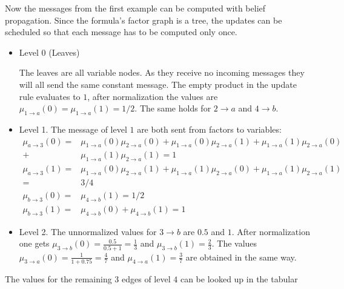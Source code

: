 \begin{example}
Now the messages from the first example can be computed with belief propagation.
Since the formula's factor graph is a tree, the updates can be scheduled so that each message has to be computed only once.

\begin{itemize}
\item Level 0 (Leaves)

The leaves are all variable nodes. As they receive no incoming messages they will all send the same constant message. The empty product in the update rule evaluates to $1$, after normalization the values are \newline $\mu_{1 \rightarrow a}(0) = \mu_{1 \rightarrow a}(1) = 1/2$. The same holds for $2 \rightarrow a$ and $4 \rightarrow b$.

\item Level 1.
The message of level $1$ are both sent from factors to variables: 
\begin{align*}
\mu_{a \rightarrow 3}(0) = &\mu_{1 \rightarrow a}(0)\mu_{2 \rightarrow a}(0) + \mu_{1 \rightarrow a}(0)\mu_{2 \rightarrow a}(1) + \mu_{1 \rightarrow a}(1) \mu_{2 \rightarrow a}(0) \\ + & \mu_{1 \rightarrow a}(1)\mu_{2 \rightarrow a}(1) = 1 \\
\mu_{a \rightarrow 3}(1) = &\mu_{1 \rightarrow a}(0)\mu_{2 \rightarrow a}(1) + \mu_{1 \rightarrow a}(1) \mu_{2 \rightarrow a}(0) + \mu_{1 \rightarrow a}(1)\mu_{2 \rightarrow a}(1) \\ = &3/4 \\
\mu_{b \rightarrow 3}(0) = &\mu_{4 \rightarrow b}(1) = 1/2 \\
\mu_{b \rightarrow 3}(1) = &\mu_{4 \rightarrow b}(0) + \mu_{4 \rightarrow b}(1) = 1
\end{align*}

\item Level 2.
The unnormalized values for $3 \rightarrow b$ are $0.5$ and $1$. After normalization one gets $\mu_{3 \rightarrow b}(0) = \frac{0.5}{0.5 + 1} = \frac{1}{3}$ and $\mu_{3 \rightarrow b}(1) = \frac{2}{3}$. \newline
The values $\mu_{3 \rightarrow a}(0) = \frac{1}{1 + 0.75} = \frac{4}{7}$ and $\mu_{4 \rightarrow a}(1) = \frac{3}{7}$ are obtained in the same way.

\end{itemize}
The values for the remaining 3 edges of level $4$ can be looked up in the tabular

\end{example}

